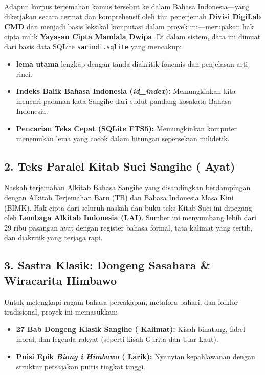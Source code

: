 Adapun korpus terjemahan kamus tersebut ke dalam Bahasa Indonesia---yang dikerjakan secara cermat dan komprehensif oleh tim penerjemah \textbf{Divisi DigiLab CMD} dan menjadi basis leksikal komputasi dalam proyek ini---merupakan hak cipta milik \textbf{Yayasan Cipta Mandala Dwipa}. Di dalam sistem, data ini dimuat dari basis data SQLite \texttt{sarindi.sqlite} yang mencakup:
\begin{itemize}
    \item \textbf{\StatLemmaTotal{} lema utama} lengkap dengan tanda diakritik fonemis dan penjelasan arti rinci.
    \item \textbf{Indeks Balik Bahasa Indonesia (\textit{id\_index}):} Memungkinkan kita mencari padanan kata Sangihe dari sudut pandang kosakata Bahasa Indonesia.
    \item \textbf{Pencarian Teks Cepat (SQLite FTS5):} Memungkinkan komputer menemukan lema yang cocok dalam hitungan sepersekian milidetik.
\end{itemize}

\subsection{2. Teks Paralel Kitab Suci Sangihe (\StatCorpusBible{} Ayat)}
Naskah terjemahan Alkitab Bahasa Sangihe yang disandingkan berdampingan dengan Alkitab Terjemahan Baru (TB) dan Bahasa Indonesia Masa Kini (BIMK). Hak cipta dari seluruh naskah dan buku teks Kitab Suci ini dipegang oleh \textbf{Lembaga Alkitab Indonesia (LAI)}. Sumber ini menyumbang lebih dari 29 ribu pasangan ayat dengan register bahasa formal, tata kalimat yang tertib, dan diakritik yang terjaga rapi.

\subsection{3. Sastra Klasik: Dongeng Sasahara \& Wiracarita Himbawo}
Untuk melengkapi ragam bahasa percakapan, metafora bahari, dan folklor tradisional, proyek ini memasukkan:
\begin{itemize}
    \item \textbf{27 Bab Dongeng Klasik Sangihe (\StatCorpusDongeng{} Kalimat):} Kisah binatang, fabel moral, dan legenda rakyat (seperti kisah Gurita dan Ular Laut).
    \item \textbf{Puisi Epik \textit{Biong i Himbawo} (\StatCorpusHimbawo{} Larik):} Nyanyian kepahlawanan dengan struktur persajakan puitis tingkat tinggi.
\end{itemize}


